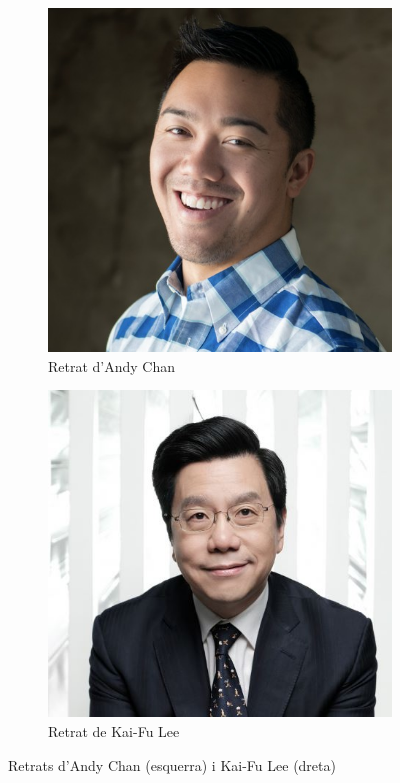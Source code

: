 \documentclass[a4paper,12pt]{article}
\begin{document}
\begin{figure}[h!]
    \centering
    \begin{subfigure}[b]{0.45\linewidth}
        \includegraphics[width=\linewidth]{images/1565701087600.jpg}
        \caption{Retrat d'Andy Chan}
        \label{fig:chan}
    \end{subfigure}
    \begin{subfigure}[b]{0.47\linewidth}
        \includegraphics[width=\linewidth]{images/Capture_medium.jpg}
        \caption{Retrat de Kai-Fu Lee}
        \label{fig:lee}
    \end{subfigure}
    \caption{Retrats d'Andy Chan (esquerra) i Kai-Fu Lee (dreta)}
    \label{fig:AndyKai}
\end{figure}
\end{document}

